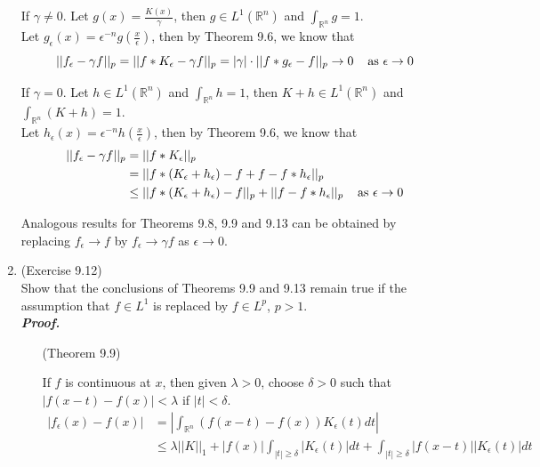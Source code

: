 \documentclass[a4paper,11pt]{article}
\begin{document}
\begin{enumerate}
		If $\gamma \neq 0$. Let $g(x) = \frac{K(x)}{\gamma}$, then $g \in L^1(\mathbb{R}^n)$ and $\int_{\mathbb{R}^n} g = 1$.\\
		Let $g_\epsilon (x) = \epsilon^{-n} g(\frac{x}{\epsilon})$, then by Theorem 9.6, we know that
			$$||f_\epsilon - \gamma f||_p
			= ||f \ast K_\epsilon - \gamma f||_p
			= |\gamma| \cdot ||f \ast g_\epsilon - f||_p
			\to 0 \hspace{0.4cm} \text{as $\epsilon \to 0$}$$

		If $\gamma = 0$. Let $h \in L^1(\mathbb{R}^n)$ and $\int_{\mathbb{R}^n} h = 1$, then $K + h \in L^1(\mathbb{R}^n)$ and $\int_{\mathbb{R}^n} (K + h) = 1$.\\
		Let $h_\epsilon (x) = \epsilon^{-n} h(\frac{x}{\epsilon})$, then by Theorem 9.6, we know that
			$$\begin{aligned}
			||f_\epsilon - \gamma f||_p
			&= ||f \ast K_\epsilon ||_p\\
			&= ||f \ast (K_\epsilon + h_\epsilon) - f + f - f \ast h_\epsilon ||_p\\
			&\leq ||f \ast (K_\epsilon + h_\epsilon) - f||_p + || f - f \ast h_\epsilon ||_p
			\hspace{0.4 cm} \text{as $\epsilon \to 0$}
			\end{aligned}$$

		Analogous results for Theorems 9.8, 9.9 and 9.13 can be obtained by replacing $f_\epsilon \to f$ by $f_\epsilon \to \gamma f$ as $\epsilon \to 0$.\\

	\item (Exercise 9.12)\\
		Show that the conclusions of Theorems 9.9 and 9.13 remain true if the assumption that $f \in L^1$ is replaced by $f \in L^p$, $p > 1$.\\
	\newline
	\textit{\textbf {Proof.}}\\

	\begin{enumerate}
		\item [(Theorem 9.9)]

			If $f$ is continuous at $x$, then given $\lambda > 0$, choose $\delta > 0$ such that $|f(x-t) - f(x)| < \lambda$ if $|t| < \delta$.
				$$\begin{aligned}
				|f_\epsilon (x) - f(x)|
				&= |\int_{\mathbb{R}^n} (f(x-t) - f(x)) K_\epsilon (t) dt|\\
				&\leq \lambda ||K||_1 + |f(x)| \int_{|t| \geq \delta} |K_\epsilon (t)| dt + \int_{|t| \geq \delta} |f(x-t)| |K_\epsilon (t)| dt
				\end{aligned}$$


\end{enumerate}
\end{enumerate}
\end{document}
